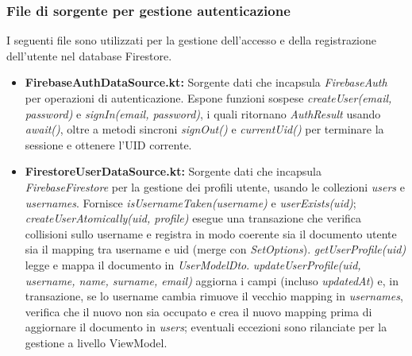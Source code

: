 \documentclass{article}
\begin{document}
\subsubsection{File di sorgente per gestione autenticazione}
I seguenti file sono utilizzati per la gestione dell'accesso e della registrazione dell'utente nel database Firestore.
\begin{itemize}
  \item \textbf{FirebaseAuthDataSource.kt:} Sorgente dati che incapsula \textit{FirebaseAuth} per operazioni di autenticazione. 
  Espone funzioni sospese \textit{createUser(email, password)} e \textit{signIn(email, password)}, i quali ritornano \textit{AuthResult} usando \textit{await()}, oltre a metodi sincroni \textit{signOut()} e \textit{currentUid()} per terminare la sessione e ottenere l’UID corrente.

  \item \textbf{FirestoreUserDataSource.kt:} Sorgente dati che incapsula \textit{FirebaseFirestore} per la gestione dei profili utente, usando le collezioni \textit{users} e \textit{usernames}. 
  Fornisce \textit{isUsernameTaken(username)} e \textit{userExists(uid)}; \textit{createUserAtomically(uid, profile)} esegue una transazione che verifica collisioni sullo username e registra in modo coerente sia il documento utente sia il mapping tra username e uid (merge con \textit{SetOptions}). \textit{getUserProfile(uid)} legge e mappa il documento in \textit{UserModelDto}. \textit{updateUserProfile(uid, username, name, surname, email)} aggiorna i campi (incluso \textit{updatedAt}) e, in transazione, se lo username cambia rimuove il vecchio mapping in \textit{usernames}, verifica che il nuovo non sia occupato e crea il nuovo mapping prima di aggiornare il documento in \textit{users}; eventuali eccezioni sono rilanciate per la gestione a livello ViewModel.

\end{itemize}
\end{document}

